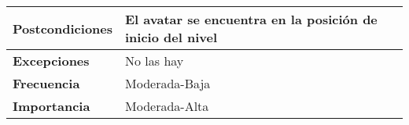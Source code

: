 \begin{longtable}{l|l}
\begin{minipage}{0.25\columnwidth}
\textbf{Postcondiciones} 
\end{minipage}
&
\begin{minipage}{0.65\columnwidth}
El avatar se encuentra en la posición de inicio del nivel
\end{minipage}
\\ \hline

\begin{minipage}{0.25\columnwidth}
\textbf{Excepciones} 
\end{minipage}
&
\begin{minipage}{0.65\columnwidth}
No las hay 
\end{minipage}
\\ \hline

\begin{minipage}{0.25\columnwidth}
\textbf{Frecuencia} 
\end{minipage}
&
\begin{minipage}{0.65\columnwidth}
Moderada-Baja
\end{minipage}
\\ \hline

\begin{minipage}{0.25\columnwidth}
\textbf{Importancia} 
\end{minipage}
&
\begin{minipage}{0.65\columnwidth}
Moderada-Alta
\end{minipage}
\\ \hline
\end{longtable}

